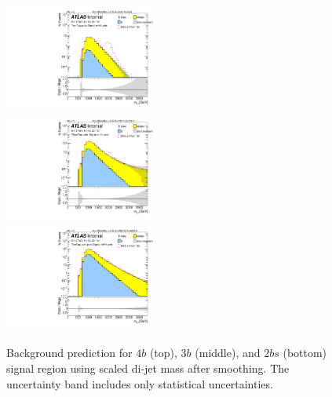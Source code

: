 \begin{figure}[htbp!]
\begin{center}
\includegraphics[width=0.45\textwidth,angle=-90]{figures/boosted/Smooth/Moriond_bkg_9_FourTag_pole_Signal_mHH_pole_1_blind.pdf}\\
\includegraphics[width=0.45\textwidth,angle=-90]{figures/boosted/Smooth/Moriond_bkg_9_ThreeTag_pole_Signal_mHH_pole_1_blind.pdf}\\
\includegraphics[width=0.45\textwidth,angle=-90]{figures/boosted/Smooth/Moriond_bkg_9_TwoTag_split_pole_Signal_mHH_pole_1_blind.pdf}
\end{center}
\caption{Background prediction for $4b$ (top), $3b$ (middle), and $2bs$ (bottom) signal region using scaled di-jet mass after smoothing. The uncertainty band includes only statistical uncertainties.}
\label{fig:signal-region-mjjscaled-smooth-bkg-noSYS}
\end{figure}
